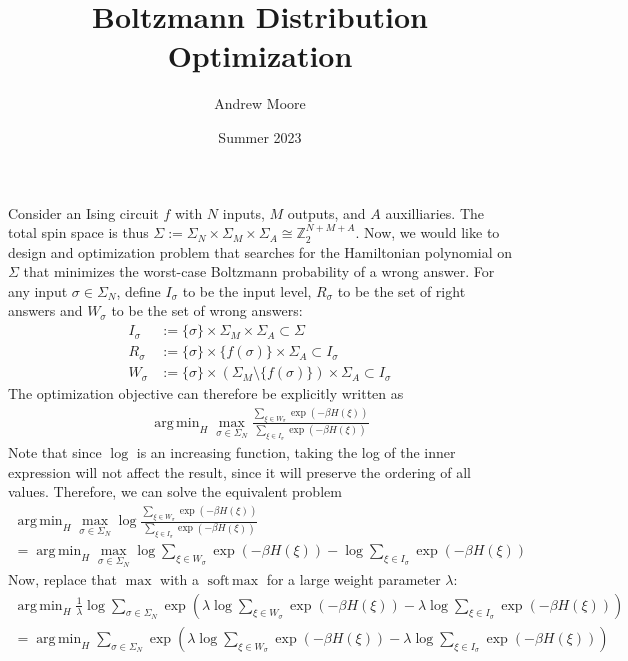 \documentclass{article}
\title{Boltzmann Distribution Optimization}
\author{Andrew Moore}
\date{Summer 2023}
\newcommand{\Z}{{\mathbb{Z}}}
\DeclareMathOperator*{\argmin}{arg\,min}
\DeclareMathOperator*{\softmax}{soft\,max}
\begin{document}
\maketitle

Consider an Ising circuit $f$ with $N$ inputs, $M$ outputs, and $A$ auxilliaries. The total spin space is thus $\Sigma := \Sigma_N \times \Sigma_M \times \Sigma_A \cong \Z_2^{N+M+A}$. Now, we would like to design and optimization problem that searches for the Hamiltonian polynomial on $\Sigma$ that minimizes the worst-case Boltzmann probability of a wrong answer. For any input $\sigma \in \Sigma_N$, define $I_\sigma$ to be the input level, $R_\sigma$ to be the set of right answers and $W_\sigma$ to be the set of wrong answers:
\begin{align}
	I_\sigma &:= \{\sigma\} \times \Sigma_M \times \Sigma_A \subset \Sigma\\
	R_\sigma &:= \{\sigma\} \times \{f(\sigma)\} \times \Sigma_A \subset I_\sigma \\
	W_\sigma &:= \{\sigma\} \times (\Sigma_M \setminus \{f(\sigma)\}) \times \Sigma_A \subset I_\sigma
\end{align}
The optimization objective can therefore be explicitly written as
\begin{align}
	\argmin_H \max_{\sigma \in \Sigma_N} \frac{\sum_{\xi \in W_\sigma} \exp(-\beta H(\xi))}{\sum_{\xi \in I_\sigma} \exp(-\beta H(\xi))}
\end{align}
Note that since $\log$ is an increasing function, taking the log of the inner expression will not affect the result, since it will preserve the ordering of all values. Therefore, we can solve the equivalent problem
\begin{align}
	\argmin_H \max_{\sigma \in \Sigma_N} \log \frac{\sum_{\xi \in W_\sigma} \exp(-\beta H(\xi))}{\sum_{\xi \in I_\sigma} \exp(-\beta H(\xi))}\\
	= \argmin_H \max_{\sigma \in \Sigma_N} \log \sum_{\xi \in W_\sigma} \exp(-\beta H(\xi)) - \log \sum_{\xi \in I_\sigma} \exp(-\beta H(\xi)) 
\end{align}
Now, replace that $\max$ with a $\softmax$ for a large weight parameter $\lambda$:
\begin{align}
	\argmin_H \frac{1}{\lambda} \log \sum_{\sigma \in \Sigma_N} \exp\left(\lambda\log \sum_{\xi \in W_\sigma} \exp(-\beta H(\xi)) - \lambda\log \sum_{\xi \in I_\sigma} \exp(-\beta H(\xi)) \right) \\
	= \argmin_H \sum_{\sigma \in \Sigma_N} \exp\left(\lambda\log \sum_{\xi \in W_\sigma} \exp(-\beta H(\xi)) - \lambda\log \sum_{\xi \in I_\sigma} \exp(-\beta H(\xi)) \right)
\end{align}
\end{document}
